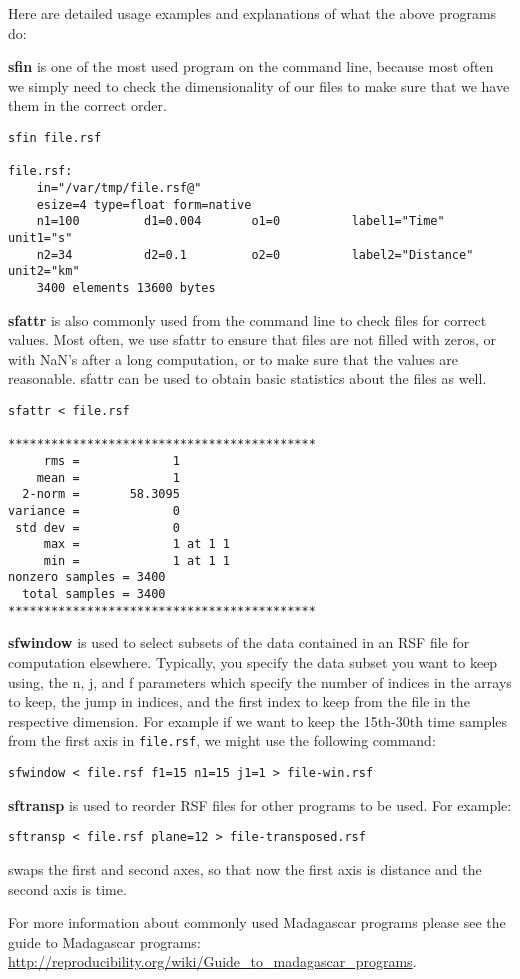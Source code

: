 Here are detailed usage examples and explanations of what the above programs do:

\textbf{sfin} is one of the most used program on the command line, because most often we simply need to check the dimensionality of our files to make sure that we have them in the correct order.
\begin{verbatim}
sfin file.rsf
 
file.rsf:
    in="/var/tmp/file.rsf@"
    esize=4 type=float form=native 
    n1=100         d1=0.004       o1=0          label1="Time" unit1="s" 
    n2=34          d2=0.1         o2=0          label2="Distance" unit2="km" 
	3400 elements 13600 bytes
\end{verbatim}

\textbf{sfattr} is also commonly used from the command line to check files for correct values. Most often, we use sfattr to ensure that files are not filled with zeros, or with NaN's after a long computation, or to make sure that the values are reasonable. sfattr can be used to obtain basic statistics about the files as well.

\begin{verbatim}
sfattr < file.rsf 
 
******************************************* 
     rms =             1 
    mean =             1 
  2-norm =       58.3095 
variance =             0 
 std dev =             0 
     max =             1 at 1 1 
     min =             1 at 1 1 
nonzero samples = 3400 
  total samples = 3400 
*******************************************
\end{verbatim}

\textbf{sfwindow} is used to select subsets of the data contained in an RSF file for computation elsewhere. Typically, you specify the data subset you want to keep using, the n, j, and f parameters which specify the number of indices in the arrays to keep, the jump in indices, and the first index to keep from the file in the respective dimension. For example if we want to keep the 15th-30th time samples from the first axis in \texttt{file.rsf}, we might use the following command:
\begin{verbatim}
sfwindow < file.rsf f1=15 n1=15 j1=1 > file-win.rsf
\end{verbatim}

\textbf{sftransp} is used to reorder RSF files for other programs to be used. For example:
\begin{verbatim}
sftransp < file.rsf plane=12 > file-transposed.rsf
\end{verbatim}
swaps the first and second axes, so that now the first axis is distance and the second axis is time.

For more information about commonly used Madagascar programs please see the guide to Madagascar programs: \url{http://reproducibility.org/wiki/Guide_to_madagascar_programs}.


